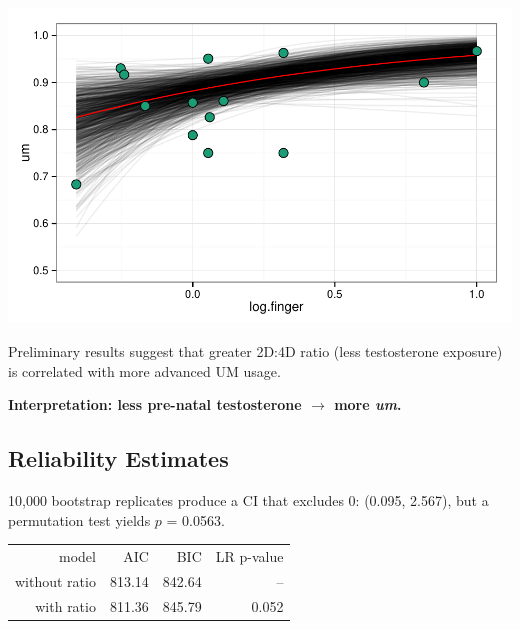 \documentclass[a0,portrait]{a0poster}
\begin{document}
\begin{multicols}{2}
\begin{minipage}[c]{0.70\linewidth}
\includegraphics[width=1\linewidth]{finger_effect.pdf}
\end{minipage}
%
\begin{minipage}[c]{0.25\linewidth}
\large
Preliminary results suggest that greater 2D:4D ratio (less testosterone exposure) is correlated with more advanced UM usage.
\end{minipage}

\begin{center}
\noindent\textbf{Interpretation: less pre-natal testosterone $\rightarrow$ more \textsl{um}.}
\end{center}

\subsection*{Reliability Estimates}
10,000 bootstrap replicates produce a CI that excludes 0: (0.095,  2.567), but a permutation test yields $p$ = 0.0563.

\begin{center}
\begin{tabular}{rrrr}
\toprule
	model & AIC & BIC & LR p-value\\
	\cmidrule{2-4}
without ratio & 813.14 & 842.64 & -- \\
with ratio &  811.36 & 845.79 & 0.052\\
\bottomrule
\end{tabular}
\end{center}


\end{multicols}
\end{document}
